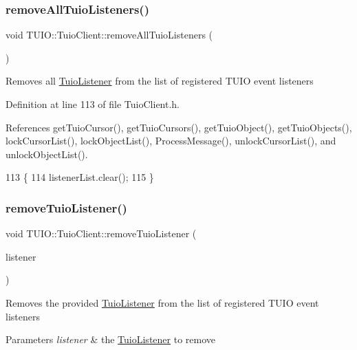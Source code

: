 \subsubsection{\texorpdfstring{remove\+All\+Tuio\+Listeners()}{removeAllTuioListeners()}}
{\footnotesize\ttfamily void T\+U\+I\+O\+::\+Tuio\+Client\+::remove\+All\+Tuio\+Listeners (\begin{DoxyParamCaption}{ }\end{DoxyParamCaption})\hspace{0.3cm}{\ttfamily [inline]}}

Removes all \hyperlink{class_t_u_i_o_1_1_tuio_listener}{Tuio\+Listener} from the list of registered T\+U\+IO event listeners 

Definition at line 113 of file Tuio\+Client.\+h.



References get\+Tuio\+Cursor(), get\+Tuio\+Cursors(), get\+Tuio\+Object(), get\+Tuio\+Objects(), lock\+Cursor\+List(), lock\+Object\+List(), Process\+Message(), unlock\+Cursor\+List(), and unlock\+Object\+List().


\begin{DoxyCode}
113                                       \{ 
114             listenerList.clear();
115         \}
\end{DoxyCode}
\mbox{\label{class_t_u_i_o_1_1_tuio_client_a0519f60177d5469b2438ca9f86b557fb}} 
\subsubsection{\texorpdfstring{remove\+Tuio\+Listener()}{removeTuioListener()}}
{\footnotesize\ttfamily void T\+U\+I\+O\+::\+Tuio\+Client\+::remove\+Tuio\+Listener (\begin{DoxyParamCaption}\item[{\hyperlink{class_t_u_i_o_1_1_tuio_listener}{Tuio\+Listener} $\ast$}]{listener }\end{DoxyParamCaption})}

Removes the provided \hyperlink{class_t_u_i_o_1_1_tuio_listener}{Tuio\+Listener} from the list of registered T\+U\+IO event listeners


\begin{DoxyParams}{Parameters}
{\em listener} & the \hyperlink{class_t_u_i_o_1_1_tuio_listener}{Tuio\+Listener} to remove \\
\hline
\end{DoxyParams}


